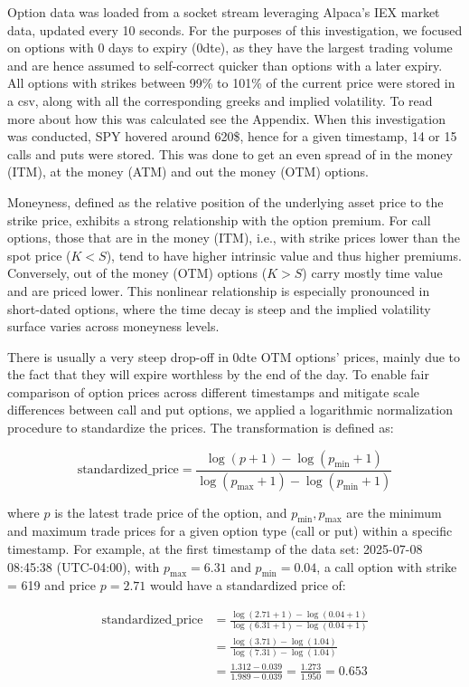 \documentclass{article}
\begin{document}
Option data was loaded from a socket stream leveraging Alpaca's IEX market data, updated every 10 seconds. For the purposes of this investigation, we focused on options with 0 days to expiry (0dte), as they have the largest trading volume and are hence assumed to self-correct quicker than options with a later expiry. All options with strikes between 99\% to 101\% of the current price were stored in a csv, along with all the corresponding greeks and implied volatility. To read more about how this was calculated see the Appendix. When this investigation was conducted, SPY hovered around 620\$, hence for a given timestamp, 14 or 15 calls and puts were stored. This was done to get an even spread of in the money (ITM), at the money (ATM) and out the money (OTM) options.

Moneyness, defined as the relative position of the underlying asset price to the strike price, exhibits a strong relationship with the option premium. For call options, those that are in the money (ITM), i.e., with strike prices lower than the spot price (\(K < S\)), tend to have higher intrinsic value and thus higher premiums. Conversely, out of the money (OTM) options (\(K > S\)) carry mostly time value and are priced lower. This nonlinear relationship is especially pronounced in short-dated options, where the time decay is steep and the implied volatility surface varies across moneyness levels.

There is usually a very steep drop-off in 0dte OTM options' prices, mainly due to the fact that they will expire worthless by the end of the day. To enable fair comparison of option prices across different timestamps and mitigate scale differences between call and put options, we applied a logarithmic normalization procedure to standardize the prices. The transformation is defined as:

\[
\text{standardized\_price} = \frac{\log(p + 1) - \log(p_{\min} + 1)}{\log(p_{\max} + 1) - \log(p_{\min} + 1)}
\]

where \(p\) is the latest trade price of the option, and \(p_{\min}, p_{\max}\) are the minimum and maximum trade prices for a given option type (call or put) within a specific timestamp. For example, at the first timestamp of the data set: 2025-07-08 08:45:38 (UTC-04:00), with \(p_{\max} = 6.31\) and \(p_{\min} = 0.04\), a call option with strike = 619 and price \(p = 2.71\) would have a standardized price of:

\begin{align}
\text{standardized\_price} &= \frac{\log(2.71 + 1) - \log(0.04 + 1)}{\log(6.31 + 1) - \log(0.04 + 1)} \nonumber \\
&= \frac{\log(3.71) - \log(1.04)}{\log(7.31) - \log(1.04)} \nonumber \\
&= \frac{1.312 - 0.039}{1.989 - 0.039} = \frac{1.273}{1.950} = 0.653
\end{align}
\end{document}

